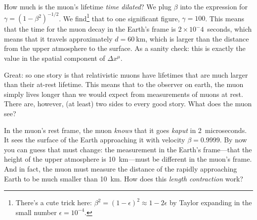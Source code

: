 \documentclass[12pt, oneside]{report}    %
\begin{document}
How much is the muon's lifetime \emph{time dilated}? We plug $\beta$ into the expression for $\gamma = (1-\beta^2)^{-1/2}$. We find\footnote{There's a cute trick here: $\beta^2 = (1-\epsilon)^2 \approx 1- 2\epsilon$ by Taylor expanding in the small number $\epsilon = 10^{-4}$.} that to one significant figure, $\gamma = 100$. This means that the time for the muon decay in the Earth's frame is $2\times 10^-4$~seconds, which means that it travels approximately $d=60~$km, which is larger than the distance from the upper atmosphere to the surface. As a sanity check: this is exactly the value in the spatial component of $\Delta x^\mu$.

Great: so one story is that relativistic muons have lifetimes that are much larger than their at-rest lifetime. This means that to the observer on earth, the muon simply lives longer than we would expect from measurements of muons at rest. There are, however, (at least) two sides to every good story. What does the muon see?

In the muon's rest frame, the muon \emph{knows} that it goes \emph{kaput} in 2~microseconds. It sees the surface of the Earth approaching it with velocity $\beta = 0.9999$. By now you can guess that must change: the measurement in the Earth's frame---that the height of the upper atmosphere is 10~km---must be different in the muon's frame. And in fact, the muon must measure the distance of the rapidly approaching Earth to be much smaller than 10~km. How does this \emph{length contraction} work? 
\end{document}
